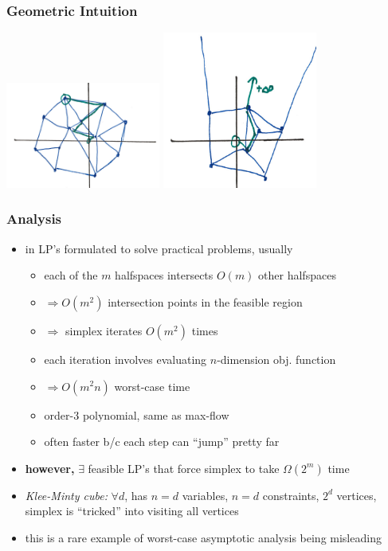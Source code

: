 \documentclass[10pt,aspectratio=169]{beamer}
\begin{document}
\begin{frame} \frametitle{Geometric Intuition}
\begin{center}
  \includegraphics[width=2in]{simplex-solution.png}
  \includegraphics[width=2in]{simplex-unbounded.png}
\end{center}
\end{frame}

\begin{frame} \frametitle{Analysis}
  \begin{itemize}
    \item in LP's formulated to solve practical problems, usually
    \begin{itemize}
      \item each of the $m$ halfspaces intersects $O(m)$ other
        halfspaces
      \item $\Rightarrow O(m^2)$ intersection points in the feasible region
      \item $\Rightarrow$ simplex iterates $O(m^2)$ times
      \item each iteration involves evaluating $n$-dimension obj. function
      \item $\Rightarrow O(m^2 n)$ worst-case time
      \item order-3 polynomial, same as max-flow
      \item often faster b/c each step can ``jump'' pretty far
    \end{itemize}
    \item \textbf{however,} $\exists$ feasible LP's that force simplex to take
      $\Omega(2^m)$ time
    \item \emph{Klee-Minty cube:} $\forall d$, has $n=d$ variables, $n=d$ constraints,
      $2^d$ vertices, simplex is ``tricked'' into visiting all vertices
    \item this is a rare example of worst-case asymptotic analysis being misleading
    \end{itemize}
\end{frame}
\end{document}
